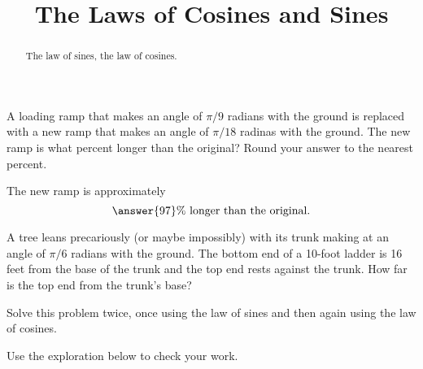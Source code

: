 \documentclass{ximera}
\title{The Laws of Cosines and Sines}
\begin{document}
\begin{abstract}
The law of sines, the law of cosines.
\end{abstract}
\maketitle


\begin{question} \label{Q0:SineCosine}
A loading ramp that makes an angle of $\pi/9$ radians with the ground is replaced with a new ramp that makes an angle of $\pi/18$ radinas with the ground. The new ramp is what percent longer than the original? Round your answer to the nearest percent.

The new ramp is approximately 
\[
   \answer{97}\% \text{ longer than the original.}
\]


\end{question}


\begin{question} \label{Q00:SineCosine}
A tree leans precariously (or maybe impossibly) with its trunk making at an angle of $\pi/6$ radians with the ground. The bottom end of a 10-foot ladder is 16 feet from the base of the trunk and the top end rests against the trunk. How far is the top end from the trunk's base? 

Solve this problem twice, once using the law of sines and then again using the law of cosines.

Use the exploration below to check your work.

\begin{exploration}

 
\begin{onlineOnly}
    \begin{center}
\end{center}
\end{onlineOnly}
\end{exploration} 

\end{question}
\end{document}
